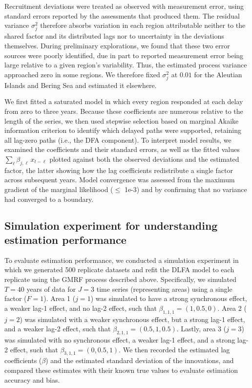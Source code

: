 \documentclass[12pt]{article}
\begin{document}
Recruitment deviations were treated as observed with measurement error,
using standard errors reported by the assessments that produced them.
The residual variance $\sigma_j^2$ therefore absorbs variation in each
region attributable neither to the shared factor and its distributed
lags nor to uncertainty in the deviations themselves. During preliminary
explorations, we found that these two error sources were poorly
identified, due in part to reported measurement error being large
relative to a given region's variability. Thus, the estimated process
variance approached zero in some regions. We therefore fixed
$\sigma_j^2$ at $0.01$ for the Aleutian Islands and Bering Sea and
estimated it elsewhere.

We first fitted a saturated model in which every region responded at
each delay from zero to three years. Because these coefficients are
numerous relative to the length of the series, we then used stepwise
selection based on marginal Akaike information criterion to identify
which delayed paths were supported, retaining all lag-zero paths (i.e.,
the DFA component). To interpret model results, we examined the
coefficients and their standard errors, as well as the fitted values
$\sum_{\ell} \beta_{j,\ell}\, x_{t-\ell}$ plotted against both the
observed deviations and the estimated factor, the latter showing how the
lag coefficients redistribute a single factor across subsequent years.
Model convergence was assessed from the maximum gradient of the marginal
likelihood ($\le$ 1e-3) and by confirming that no variance had converged
to a boundary.

\subsection{Simulation experiment for understanding estimation performance}
To evaluate estimation performance, we conducted a simulation experiment
in which we generated 500 replicate datasets and refit the DLFA model to
each replicate using the GMRF process described above. Specifically, we
simulated $T=40$ years of data for $J=3$ time series (representing
areas) using a single factor ($F=1$). Area 1 ($j=1$) was simulated to
have a strong synchronous effect, a weaker lag-1 effect, and no lag-2
effect, such that $\beta_{1,1,1} = (1, 0.5, 0)$. Area 2 ($j=2$) was
simulated with a weaker synchronous effect, but a strong lag-1 effect,
and a weaker lag-2 effect, such that $\beta_{2,1,1} = (0.5, 1, 0.5)$.
Lastly, area 3 ($j=3$) was simulated with no synchronous effect, a
weaker lag-1 effect, and a strong lag-2 effect, such that $\beta_{3,1,1}
= (0, 0.5, 1)$. We then recorded the estimated lag coefficients
($\beta$) and the estimated standard deviation of the innovations, and
compared these estimates with their known true values to evaluate
estimation accuracy and bias.
\end{document}
